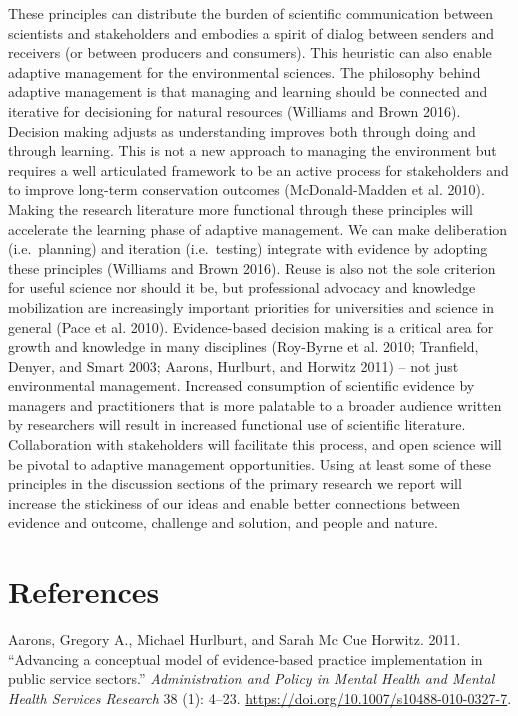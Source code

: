 \documentclass[fleqn,10pt]{wlpeerj} %
\begin{document}
These principles can distribute the burden of scientific communication
between scientists and stakeholders and embodies a spirit of dialog
between senders and receivers (or between producers and consumers). This
heuristic can also enable adaptive management for the environmental
sciences. The philosophy behind adaptive management is that managing and
learning should be connected and iterative for decisioning for natural
resources (Williams and Brown 2016). Decision making adjusts as
understanding improves both through doing and through learning. This is
not a new approach to managing the environment but requires a well
articulated framework to be an active process for stakeholders and to
improve long-term conservation outcomes (McDonald-Madden et al. 2010).
Making the research literature more functional through these principles
will accelerate the learning phase of adaptive management. We can make
deliberation (i.e.~planning) and iteration (i.e.~testing) integrate with
evidence by adopting these principles (Williams and Brown 2016). Reuse
is also not the sole criterion for useful science nor should it be, but
professional advocacy and knowledge mobilization are increasingly
important priorities for universities and science in general (Pace et
al. 2010). Evidence-based decision making is a critical area for growth
and knowledge in many disciplines (Roy-Byrne et al. 2010; Tranfield,
Denyer, and Smart 2003; Aarons, Hurlburt, and Horwitz 2011) -- not just
environmental management. Increased consumption of scientific evidence
by managers and practitioners that is more palatable to a broader
audience written by researchers will result in increased functional use
of scientific literature. Collaboration with stakeholders will
facilitate this process, and open science will be pivotal to adaptive
management opportunities. Using at least some of these principles in the
discussion sections of the primary research we report will increase the
stickiness of our ideas and enable better connections between evidence
and outcome, challenge and solution, and people and nature.

\hypertarget{references}{%
\section*{References}\label{references}}

\hypertarget{refs}{}
\leavevmode\hypertarget{ref-Aarons2011}{}%
Aarons, Gregory A., Michael Hurlburt, and Sarah Mc Cue Horwitz. 2011.
``Advancing a conceptual model of evidence-based practice implementation
in public service sectors.'' \emph{Administration and Policy in Mental
Health and Mental Health Services Research} 38 (1): 4--23.
\url{https://doi.org/10.1007/s10488-010-0327-7}.
\end{document}
